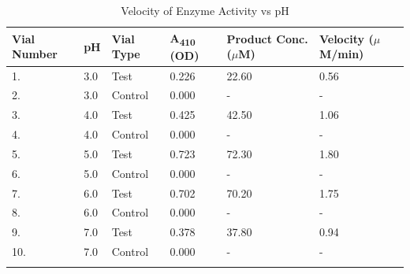 \documentclass[pdflatex,sn-mathphys]{sn-jnl}%
\theoremstyle{thmstyleone}%
\theoremstyle{thmstyletwo}%
\theoremstyle{thmstylethree}%
\begin{document}
\begin{table}[h]
  \begin{center}
    \begin{minipage}{300pt}
      \caption{Velocity of Enzyme Activity vs pH}\label{tab1}
      \begin{tabular}{  m{4em}  m{4em} m{4.5em}  m{4.5em}  m{4.5em} m{4.5em}}
        \toprule
        Vial Number & pH  & Vial Type & A\textsubscript{410} (OD) & Product Conc.\footnotemark[1] ($\mu$M) & Velocity ($\mu$M/min) \\
        \midrule
        1.          & 3.0 & Test      & 0.226                     & 22.60                                  & 0.56                  \\
        2.          & 3.0 & Control   & 0.000                     & -                                      & -                     \\
        3.          & 4.0 & Test      & 0.425                     & 42.50                                  & 1.06                  \\
        4.          & 4.0 & Control   & 0.000                     & -                                      & -                     \\
        5.          & 5.0 & Test      & 0.723                     & 72.30                                  & 1.80                  \\
        6.          & 5.0 & Control   & 0.000                     & -                                      & -                     \\
        7.          & 6.0 & Test      & 0.702                     & 70.20                                  & 1.75                  \\
        8.          & 6.0 & Control   & 0.000                     & -                                      & -                     \\
        9.          & 7.0 & Test      & 0.378                     & 37.80                                  & 0.94                  \\
        10.         & 7.0 & Control   & 0.000                     & -                                      & -                     \\
        \botrule
      \end{tabular}
    \end{minipage}
  \end{center}
\end{table}
\end{document}
